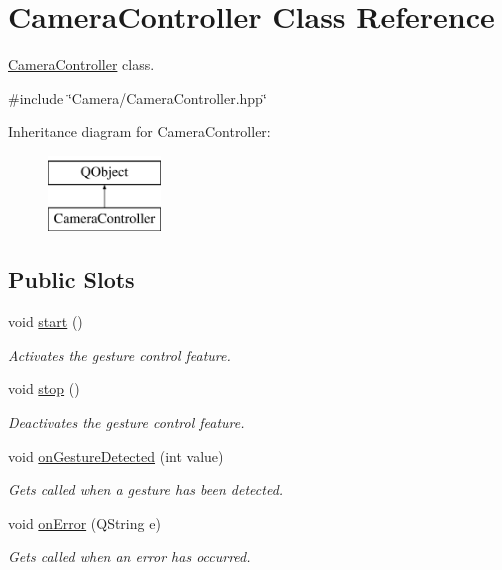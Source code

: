 \hypertarget{class_camera_controller}{}\section{Camera\+Controller Class Reference}
\label{class_camera_controller}


\hyperlink{class_camera_controller}{Camera\+Controller} class.  




{\ttfamily \#include \char`\"{}Camera/\+Camera\+Controller.\+hpp\char`\"{}}

Inheritance diagram for Camera\+Controller\+:\begin{figure}[H]
\begin{center}
\leavevmode
\includegraphics[height=2.000000cm]{class_camera_controller}
\end{center}
\end{figure}
\subsection*{Public Slots}
\begin{DoxyCompactItemize}
\item 
void \hyperlink{class_camera_controller_a94b78f28c1bce536a481ddcf16712771}{start} ()
\begin{DoxyCompactList}\small\item\em Activates the gesture control feature. \end{DoxyCompactList}\item 
void \hyperlink{class_camera_controller_ac74cc6dc570c37bfbd1da710c54e78b3}{stop} ()
\begin{DoxyCompactList}\small\item\em Deactivates the gesture control feature. \end{DoxyCompactList}\item 
void \hyperlink{class_camera_controller_ad7985bb1433289a5c09c3fdf093d7384}{on\+Gesture\+Detected} (int value)
\begin{DoxyCompactList}\small\item\em Gets called when a gesture has been detected. \end{DoxyCompactList}\item 
void \hyperlink{class_camera_controller_a0a2c8c616d31f2356b825c43afcb83bd}{on\+Error} (Q\+String e)
\begin{DoxyCompactList}\small\item\em Gets called when an error has occurred. \end{DoxyCompactList}\end{DoxyCompactItemize}
